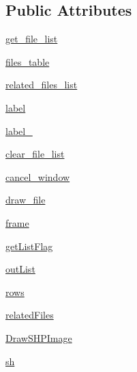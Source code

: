 \subsection*{Public Attributes}
\begin{DoxyCompactItemize}
\item 
\hyperlink{classsrc_1_1client_1_1gui_1_1draw__from__shp_1_1Ui__DrawFromSHPFile_abf944abea8a7e6887ee6b616423ecbcf}{get\_\-file\_\-list}
\item 
\hyperlink{classsrc_1_1client_1_1gui_1_1draw__from__shp_1_1Ui__DrawFromSHPFile_a9b413dac27ca913aca17a589bb493a5d}{files\_\-table}
\item 
\hyperlink{classsrc_1_1client_1_1gui_1_1draw__from__shp_1_1Ui__DrawFromSHPFile_a1f158799058d4ff6661aa1eeef279256}{related\_\-files\_\-list}
\item 
\hyperlink{classsrc_1_1client_1_1gui_1_1draw__from__shp_1_1Ui__DrawFromSHPFile_adb2260bbaf013a818d5aec5dcab32989}{label}
\item 
\hyperlink{classsrc_1_1client_1_1gui_1_1draw__from__shp_1_1Ui__DrawFromSHPFile_a46d4f926e15f564240c274571c8316b1}{label\_}
\item 
\hyperlink{classsrc_1_1client_1_1gui_1_1draw__from__shp_1_1Ui__DrawFromSHPFile_a8ec8d24ea4fe53ae1f502c2e5c778d74}{clear\_\-file\_\-list}
\item 
\hyperlink{classsrc_1_1client_1_1gui_1_1draw__from__shp_1_1Ui__DrawFromSHPFile_aa1f01b9e1ea91615e34325cf9ffb038a}{cancel\_\-window}
\item 
\hyperlink{classsrc_1_1client_1_1gui_1_1draw__from__shp_1_1Ui__DrawFromSHPFile_a4368bd0053a121a88a454da220cdacb3}{draw\_\-file}
\item 
\hyperlink{classsrc_1_1client_1_1gui_1_1draw__from__shp_1_1Ui__DrawFromSHPFile_a5f4984328caf5831f5c185f63a0c9b95}{frame}
\item 
\hyperlink{classsrc_1_1client_1_1gui_1_1draw__from__shp_1_1Ui__DrawFromSHPFile_ae4c87699e24c47b31637f8fd3affe692}{getListFlag}
\item 
\hyperlink{classsrc_1_1client_1_1gui_1_1draw__from__shp_1_1Ui__DrawFromSHPFile_ae8a615c601f017dbbefdde89bf8def2d}{outList}
\item 
\hyperlink{classsrc_1_1client_1_1gui_1_1draw__from__shp_1_1Ui__DrawFromSHPFile_aa840b67e50053261b20156a4c1fc587c}{rows}
\item 
\hyperlink{classsrc_1_1client_1_1gui_1_1draw__from__shp_1_1Ui__DrawFromSHPFile_a31082e817855dcb29a4c0b6c534c404d}{relatedFiles}
\item 
\hyperlink{classsrc_1_1client_1_1gui_1_1draw__from__shp_1_1Ui__DrawFromSHPFile_a70c528da30b29651966647dbf3f15efb}{DrawSHPImage}
\item 
\hyperlink{classsrc_1_1client_1_1gui_1_1draw__from__shp_1_1Ui__DrawFromSHPFile_ac7d8951ed8fd5ff091b9ce41e2b61add}{sh}
\end{DoxyCompactItemize}


